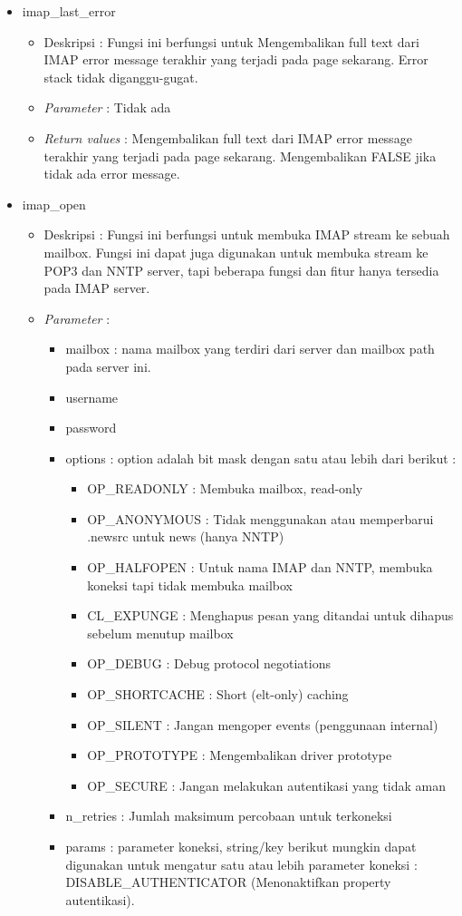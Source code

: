 \begin{itemize}
\item imap\_last\_error
\begin{itemize}
\item Deskripsi : Fungsi ini berfungsi untuk Mengembalikan full text dari IMAP error message terakhir yang terjadi pada page sekarang. Error stack tidak diganggu-gugat.
\item \textit{Parameter} : Tidak ada
\item \textit{Return values} : Mengembalikan full text dari IMAP error message terakhir yang terjadi pada page sekarang. Mengembalikan FALSE jika tidak ada error message.
\end{itemize}
 
\item imap\_open
\begin{itemize}
\item Deskripsi : Fungsi ini berfungsi untuk membuka IMAP stream ke sebuah mailbox. Fungsi ini dapat juga digunakan untuk membuka stream ke POP3 dan NNTP server, tapi beberapa fungsi dan fitur hanya tersedia pada IMAP server.
\item \textit{Parameter} :
 \begin{itemize}
 \item mailbox : nama mailbox yang terdiri dari server dan mailbox path pada server ini.
 \item username
 \item password
 \item options : option adalah bit mask dengan satu atau lebih dari berikut : 
   \begin{itemize}
   \item OP\_READONLY : Membuka mailbox, read-only
   \item OP\_ANONYMOUS : Tidak menggunakan atau memperbarui .newsrc untuk news (hanya NNTP)
   \item OP\_HALFOPEN : Untuk nama IMAP dan NNTP, membuka koneksi tapi tidak membuka mailbox
   \item CL\_EXPUNGE : Menghapus pesan yang ditandai untuk dihapus sebelum menutup mailbox
   \item OP\_DEBUG : Debug protocol negotiations
   \item OP\_SHORTCACHE : Short (elt-only) caching
   \item OP\_SILENT : Jangan mengoper events (penggunaan internal)
   \item OP\_PROTOTYPE : Mengembalikan driver prototype
   \item OP\_SECURE : Jangan melakukan autentikasi yang tidak aman
   \end{itemize}
 \item n\_retries : Jumlah maksimum percobaan untuk terkoneksi
 \item params : parameter koneksi, string/key berikut mungkin dapat digunakan untuk mengatur satu atau lebih parameter koneksi : DISABLE\_AUTHENTICATOR (Menonaktifkan property autentikasi).


\end{itemize}
\end{itemize}
\end{itemize}
